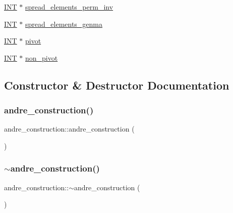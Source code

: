 \begin{DoxyCompactItemize}
\mbox{\hyperlink{galois_8h_a09fddde158a3a20bd2dcadb609de11dc}{I\+NT}} $\ast$ \mbox{\hyperlink{classandre__construction_a320088933835d42d4d280beb8e60d4c7}{spread\+\_\+elements\+\_\+perm\+\_\+inv}}
\item 
\mbox{\hyperlink{galois_8h_a09fddde158a3a20bd2dcadb609de11dc}{I\+NT}} $\ast$ \mbox{\hyperlink{classandre__construction_ad477eba111015b5232514a3bba11e6d6}{spread\+\_\+elements\+\_\+genma}}
\item 
\mbox{\hyperlink{galois_8h_a09fddde158a3a20bd2dcadb609de11dc}{I\+NT}} $\ast$ \mbox{\hyperlink{classandre__construction_a47cc7982c9b5125319b25a6ea0399374}{pivot}}
\item 
\mbox{\hyperlink{galois_8h_a09fddde158a3a20bd2dcadb609de11dc}{I\+NT}} $\ast$ \mbox{\hyperlink{classandre__construction_afe634a563c3d8c33db69d4ff2a94fab6}{non\+\_\+pivot}}
\end{DoxyCompactItemize}


\subsection{Constructor \& Destructor Documentation}
\mbox{\label{classandre__construction_a3883b32d941c249408f1ae69ed72b30a}} 
\subsubsection{\texorpdfstring{andre\+\_\+construction()}{andre\_construction()}}
{\footnotesize\ttfamily andre\+\_\+construction\+::andre\+\_\+construction (\begin{DoxyParamCaption}{ }\end{DoxyParamCaption})}

\mbox{\label{classandre__construction_a59e07cf0d8082dfdd689b028f5dedb4e}} 
\subsubsection{\texorpdfstring{$\sim$andre\+\_\+construction()}{~andre\_construction()}}
{\footnotesize\ttfamily andre\+\_\+construction\+::$\sim$andre\+\_\+construction (\begin{DoxyParamCaption}{ }\end{DoxyParamCaption})}



